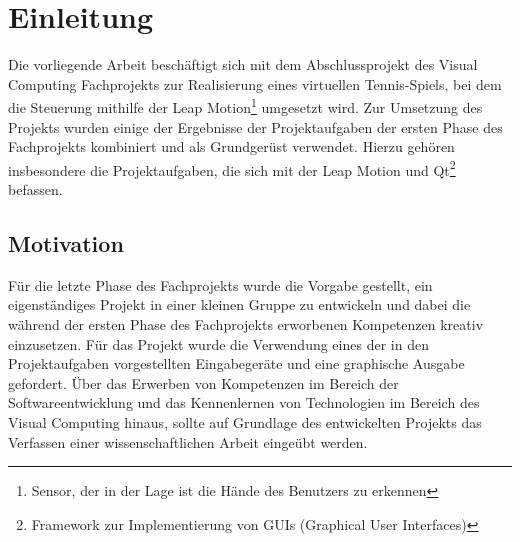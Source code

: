 
\chapter{Einleitung}
\label{Einleitung}
%
Die vorliegende Arbeit beschäftigt sich mit dem Abschlussprojekt des Visual Computing Fachprojekts zur Realisierung eines virtuellen Tennis-Spiels, bei dem die Steuerung mithilfe der Leap Motion\footnote{Sensor, der in der Lage ist die Hände des Benutzers zu erkennen} umgesetzt wird. Zur Umsetzung des Projekts wurden einige der Ergebnisse der Projektaufgaben der ersten Phase des Fachprojekts kombiniert und als Grundgerüst verwendet. Hierzu gehören insbesondere die Projektaufgaben, die sich mit der Leap Motion und Qt\footnote{Framework zur Implementierung von GUIs (Graphical User Interfaces)} befassen.

\section{Motivation}
\label{Motivation_und_Hintergrund}
% 
Für die letzte Phase des Fachprojekts wurde die Vorgabe gestellt, ein eigenständiges Projekt in einer kleinen Gruppe zu entwickeln und dabei die während der ersten Phase des Fachprojekts erworbenen Kompetenzen kreativ einzusetzen. Für das Projekt wurde die Verwendung eines der in den Projektaufgaben vorgestellten Eingabegeräte und eine graphische Ausgabe gefordert.
Über das Erwerben von Kompetenzen im Bereich der Softwareentwicklung und das Kennenlernen von Technologien im Bereich des Visual Computing hinaus, sollte auf Grundlage des entwickelten Projekts das Verfassen einer wissenschaftlichen Arbeit eingeübt werden.

\iffalse
Die Idee für die wir uns nach kurzer Beratungszeit entschieden haben sollte ein Tennis Spiel sein, wobei die Hand als Schläger fungiert und die Erkennung der Hand durch Leap Motion gewährleistet wird. 
Das Projekt besteht aus hinreichend vielen Problemen, welche wir gleichmäßig aufteilten. Die Teilprobleme haben unterteilt in die physikalischen Einflüsse, wobei
wir großen Wert auf einen realistischen Spielfluss gelegt haben, das Rendering, um die gebrauchten Objekte zu erstellen und die Steuerung, welches vor allem die korrekte Erfassung der Hand
beinhaltete. 
Die Regeln des Spieles sind sehr schnell zu erlernen und sprechen jede mögliche Zielgruppe an, da die Regeln leicht verständlich und die Steuerung sehr intuitiv sind. %
\fi

